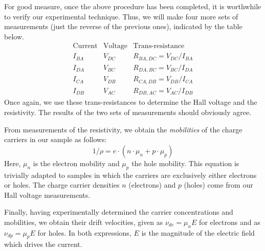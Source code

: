 \documentclass{../lab}
\begin{document}
For good measure, once the above procedure has been completed, it is worthwhile to verify our experimental technique. Thus, we will make four more sets of measurements (just the reverse of the previous ones), indicated by the table below.
\[
\begin{array}{c|c|c}
\textrm{Current} & \textrm{Voltage} & \textrm{Trans-resistance} \\
\hline
I_{BA} & V_{DC} & R_{BA,DC} = V_{DC} / I_{BA} \\
I_{DA} & V_{BC} & R_{DA,BC} = V_{BC} / I_{DA} \\
I_{CA} & V_{DB} & R_{CA,DB} = V_{DB} / I_{CA} \\
I_{DB} & V_{AC} & R_{DB,AC} = V_{AC} / I_{DB}
\end{array}
\]
Once again, we use these trans-resistances to determine the Hall voltage and the resistivity. The results of the two sets of measurements should obviously agree.

From measurements of the resistivity, we obtain the \emph{mobilities} of the charge carriers in our sample as follows:
\begin{equation}
    1/\rho = e \cdot (n \cdot \mu_n + p \cdot \mu_p)
\end{equation}
Here, $\mu_n$ is the electron mobility and $\mu_p$ the hole mobility. This equation is trivially adapted to samples in which the carriers are exclusively either electrons or holes. The charge carrier densities $n$ (electrons) and $p$ (holes) come from our Hall voltage measurements.

Finally, having experimentally determined the carrier concentrations and mobilities, we obtain their drift velocities, given as $\nu_{de} = \mu_n E$ for electrons and as $\nu_{dp} = \mu_p E$ for holes. In both expressions, $E$ is the magnitude of the electric field which drives the current.
\end{document}
